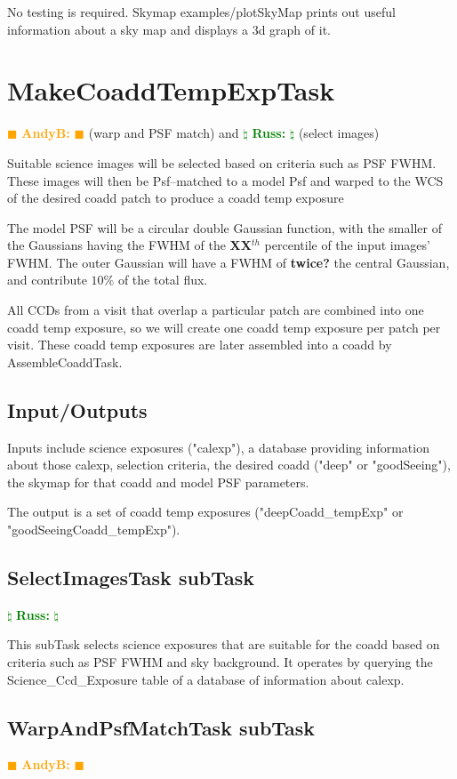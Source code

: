 \documentclass[12pt]{article}
\newcommand{\becker} { \textcolor{orange} {
\ensuremath{\blacksquare} {\bf AndyB:}  
\ensuremath{\blacksquare} } }
\newcommand{\russ} { \textcolor{green} {
\ensuremath{\natural} {\bf Russ:}  
\ensuremath{\natural} } }
\begin{document}
No testing is required.  Skymap examples/plotSkyMap prints out useful
information about a sky map and displays a 3d graph of it.


\clearpage 
\section{MakeCoaddTempExpTask} \becker (warp and PSF match) and \russ (select images)

Suitable science images will be selected based on criteria such as PSF FWHM.
These images will then be Psf--matched to a model Psf and warped
to the WCS of the desired coadd patch to produce a coadd temp exposure

The model PSF will be a circular double Gaussian
function, with the smaller of the Gaussians having the FWHM of the
{\bf XX}$^{th}$ percentile of the input images' FWHM.  The outer
Gaussian will have a FWHM of {\bf twice?} the central Gaussian, and
contribute {\bf $10\%$} of the total flux.

All CCDs from a visit that overlap a particular patch are combined into one coadd temp exposure,
so we will create one coadd temp exposure per patch per visit.
These coadd temp exposures are later assembled into a coadd by AssembleCoaddTask.

\subsection{Input/Outputs}

Inputs include science exposures ("calexp"), a database providing information about
those calexp, selection criteria, the desired coadd ("deep" or "goodSeeing"),
the skymap for that coadd and model PSF parameters.

The output is a set of coadd temp exposures ("deepCoadd\_tempExp" or "goodSeeingCoadd\_tempExp").

\subsection{SelectImagesTask subTask} \russ

This subTask selects science exposures that are suitable for the coadd
based on criteria such as PSF FWHM and sky background. It operates by
querying the Science\_Ccd\_Exposure table of a database of information about calexp.

\subsection{WarpAndPsfMatchTask subTask} \becker
\end{document}
